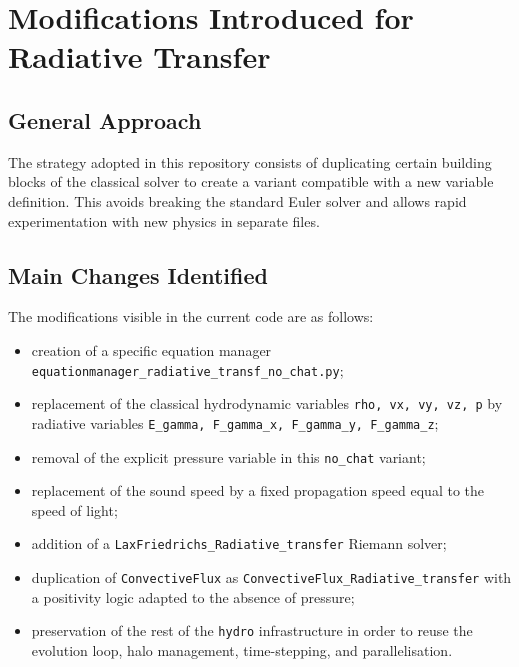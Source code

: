 \documentclass[a4paper, 11pt]{article}
\begin{document}
\section{Modifications Introduced for Radiative Transfer}

\subsection{General Approach}
The strategy adopted in this repository consists of duplicating certain building blocks of the classical solver to create a variant compatible with a new variable definition. This avoids breaking the standard Euler solver and allows rapid experimentation with new physics in separate files.

\subsection{Main Changes Identified}
The modifications visible in the current code are as follows:
\begin{itemize}
    \item creation of a specific equation manager \texttt{equationmanager\_radiative\_transf\_no\_chat.py};
    \item replacement of the classical hydrodynamic variables \texttt{rho, vx, vy, vz, p} by radiative variables \texttt{E\_gamma, F\_gamma\_x, F\_gamma\_y, F\_gamma\_z};
    \item removal of the explicit pressure variable in this \texttt{no\_chat} variant;
    \item replacement of the sound speed by a fixed propagation speed equal to the speed of light;
    \item addition of a \texttt{LaxFriedrichs\_Radiative\_transfer} Riemann solver;
    \item duplication of \texttt{ConvectiveFlux} as \texttt{ConvectiveFlux\_Radiative\_transfer} with a positivity logic adapted to the absence of pressure;
    \item preservation of the rest of the \texttt{hydro} infrastructure in order to reuse the evolution loop, halo management, time-stepping, and parallelisation.
\end{itemize}
\end{document}
